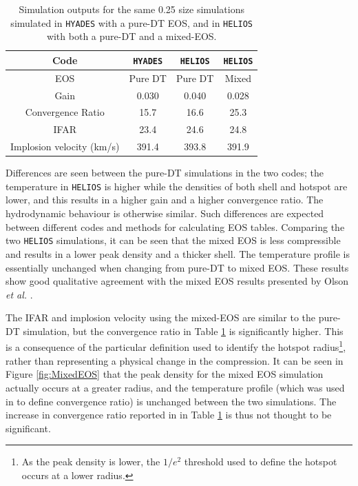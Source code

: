 \begin{table}
	\centering
	\begin{tabular}{|c|c|c|c|}
		\hline
		Code &  \texttt{HYADES} & \texttt{HELIOS} & \texttt{HELIOS} \\ 
		\hline
		EOS & Pure DT & Pure DT & Mixed \\
		\hline
		Gain & 0.030 & 0.040 & 0.028  \\
		Convergence Ratio & 15.7 & 16.6 & 25.3 \\ 
		IFAR & 23.4 & 24.6 & 24.8 \\ 
		Implosion velocity (km/s) & 391.4 & 393.8 & 391.9 \\
		\hline
	\end{tabular}
	\caption{Simulation outputs for the same 0.25 size simulations simulated in \texttt{HYADES} with a pure-DT EOS, and in \texttt{HELIOS} with both a pure-DT and a mixed-EOS.}
	\label{tab:MixedEOS}
\end{table}

Differences are seen between the pure-DT simulations in the two codes; the temperature in \texttt{HELIOS} is higher while the densities of both shell and hotspot are lower, and this results in a higher gain and a higher convergence ratio. The hydrodynamic behaviour is otherwise similar. Such differences are expected between different codes and methods for calculating EOS tables. Comparing the two \texttt{HELIOS} simulations, it can be seen that the mixed EOS is less compressible and results in a lower peak density and a thicker shell. The temperature profile is essentially unchanged when changing from pure-DT to mixed EOS. These results show good qualitative agreement with the mixed EOS results presented by Olson \textit{et al.} \cite{Olson2020a}.

The IFAR and implosion velocity using the mixed-EOS are similar to the pure-DT simulation, but the convergence ratio in Table \ref{tab:MixedEOS} is significantly higher. This is a consequence of the particular definition used to identify the hotspot radius\footnote{As the peak density is lower, the $1/e^2$ threshold used to define the hotspot occurs at a lower radius.}, rather than representing a physical change in the compression. It can be seen in Figure \ref{fig:MixedEOS} that the peak density for the mixed EOS simulation actually occurs at a greater radius, and the temperature profile (which was used in \cite{Olson2020a} to define convergence ratio) is unchanged between the two simulations. The increase in convergence ratio reported in in Table \ref{tab:MixedEOS} is thus not thought to be significant.

